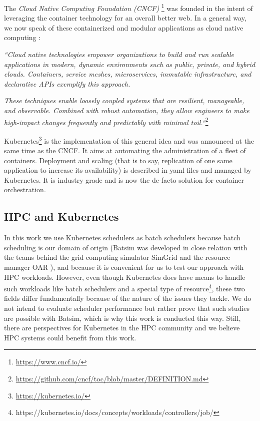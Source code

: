 The \textit{Cloud Native Computing Foundation (CNCF)
}\footnote{\url{https://www.cncf.io/}} was founded in the intent of leveraging
the container technology for an overall better web. In a general way, we now
speak of these containerized and modular applications as cloud native computing
:

\textit{``Cloud native technologies empower organizations to build and run
	scalable applications in modern, dynamic environments such as public,
	private, and hybrid clouds. Containers, service meshes, microservices,
	immutable infrastructure, and declarative APIs exemplify this
	approach.}

\textit{These techniques enable loosely coupled systems that
	are resilient, manageable, and observable.  Combined with robust
	automation, they allow engineers to make high-impact changes frequently
	and predictably with minimal toil.``}\footnote{\url{https://github.com/cncf/toc/blob/master/DEFINITION.md}}

Kubernetes\footnote{\url{https://kubernetes.io/}} is the implementation of this
general idea and was announced at the same time as the CNCF. It aims at
automating the administration of a fleet of containers. Deployment and scaling
(that is to say, replication of one same application to increase its
availability) is described in yaml files and managed by Kubernetes.  It is
industry grade and is now the de-facto solution for container orchestration.

\subsection{HPC and Kubernetes}

In this work we use Kubernetes schedulers as batch schedulers because batch
scheduling is our domain of origin (Batsim was developed in close relation with
	the teams behind the grid computing simulator
	SimGrid\cite{casanova:hal-01017319} and the resource manager OAR
\cite{oar}), and because it is convenient for us to test our approach with HPC
workloads. However, even though Kubernetes does have means to handle such
workloads like batch schedulers \cite{kube-batch} and a special type of
resource\footnote{https://kubernetes.io/docs/concepts/workloads/controllers/job/},
these two fields differ fundamentally because of the nature of the issues they
tackle. We do not intend to evaluate scheduler performance but rather prove
that such studies are possible with Batsim, which is why this work is conducted
this way. Still, there are perspectives for Kubernetes in the HPC community and
we believe HPC systems could benefit from this work.

